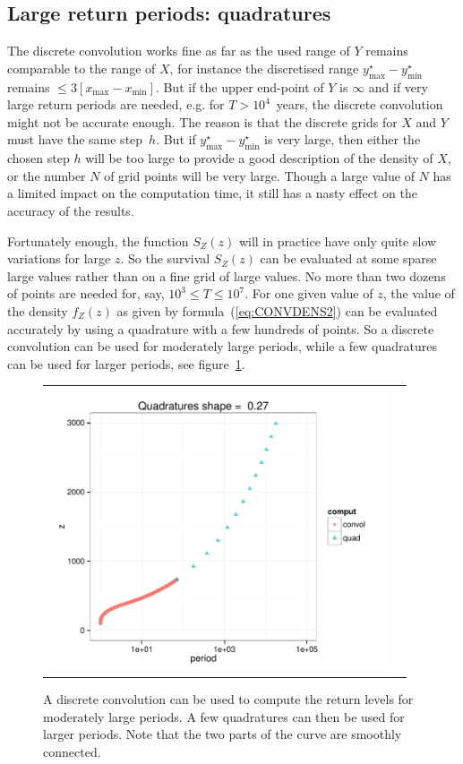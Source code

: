 \documentclass[11pt,a4paper]{report}\usepackage[]{graphicx}\usepackage[]{color}
\newcommand{\Low}[1]{#1_{\mathrm{min}}}
\newcommand{\Up}[1]{#1_{\mathrm{max}}}
\begin{document}
\subsection{Large return periods: quadratures}
The discrete convolution works fine as far as the used range of $Y$
remains comparable to the range of $X$, for instance the discretised
range $\Up{y^\star} -\Low{y^\star}$ remains $\leqslant 3 \left[\Up{x}
  -\Low{x}\right]$.  But if the upper end-point of $Y$ is $\infty$ and
if very large return periods are needed, e.g. for $T > 10^4$~years,
the discrete convolution might not be accurate enough. The reason is
that the discrete grids for $X$ and $Y$ must have the same
step~$h$. But if $\Up{y^\star} -\Low{y^\star}$ is very large, then
either the chosen step $h$ will be too large to provide a good
description of the density of $X$, or the number $N$ of grid points
will be very large. Though a large value of $N$ has a limited impact
on the computation time, it still has a nasty effect on the accuracy
of the results.

Fortunately enough, the function $S_Z(z)$ will in practice have only
quite slow variations for large $z$. So the survival $S_Z(z)$ can be evaluated
at some sparse large values rather than on a fine grid of large values. No more than 
two dozens of points are needed  for, say,  $10^3 \leqslant T \leqslant 10^7$. For one given
value of $z$, the value of the density $f_Z(z)$ as given by formula~(\ref{eq:CONVDENS2})
can be evaluated accurately by using a quadrature with a few hundreds 
of points. So a discrete convolution can be used for moderately large periods,
while a few quadratures can be used for larger periods, see figure~\ref{FigQuadPoints}.

\begin{figure}
   \centering
   \begin{tabular}{c c} 
     \includegraphics[width=10cm]{images/QuadPoints.pdf} &
   \end{tabular}
   \caption{\label{FigQuadPoints} A discrete convolution can be used
     to compute the return levels for moderately large periods. A few
     quadratures can then be used for larger periods. Note that the
     two parts of the curve are smoothly connected.}
\end{figure}
\end{document}
